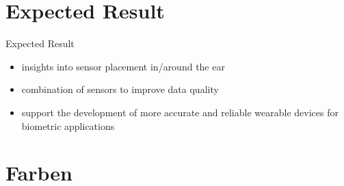\documentclass[en]{sdqbeamer}
\begin{document}
\section{Expected Result}
\begin{frame}{Expected Result}
    \begin{itemize}
        \item insights into sensor placement in/around the ear
        \item combination of sensors to improve data quality
        \item support the development of more accurate and reliable wearable devices for biometric applications
    \end{itemize}
\end{frame}

\appendix
\beginbackup




\section{Farben}
\backupend
\end{document}
